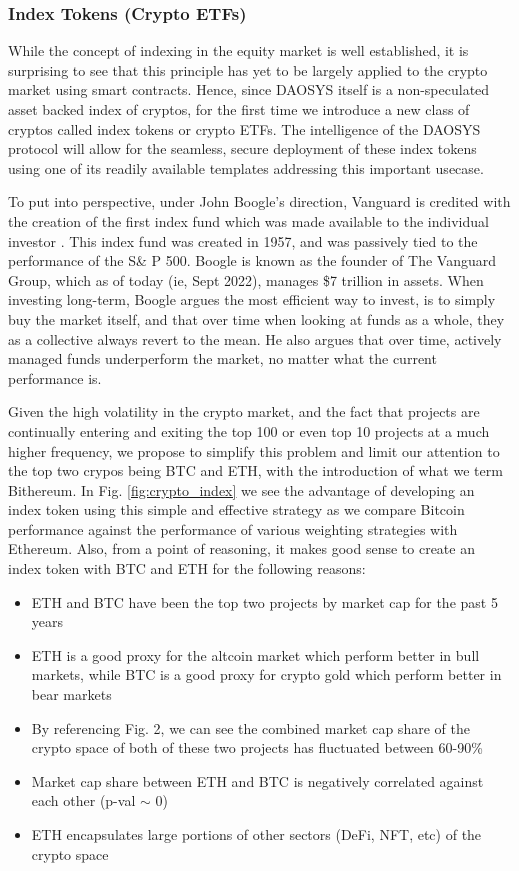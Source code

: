\documentclass[journal,twocolumn,12pt]{ieeesyscoin}
\begin{document}
\subsubsection{Index Tokens (Crypto ETFs)}

While the concept of indexing in the equity market is well established, it is surprising to see that this principle has yet to be largely applied to the crypto market using smart contracts. Hence, since DAOSYS itself is a non-speculated asset backed index of cryptos, for the first time we introduce a new class of cryptos called index tokens or crypto ETFs. The intelligence of the DAOSYS protocol will allow for the seamless, secure deployment of these index tokens using one of its readily available templates addressing this important usecase.

To put into perspective, under John Boogle’s direction, Vanguard is credited with the creation of the first index fund which was made available to the individual investor \cite{Bog17}. This index fund was created in 1957, and was passively tied to the performance of the S\& P 500. Boogle is known as the founder of The Vanguard Group, which as of today (ie, Sept 2022), manages \$7 trillion in assets. When investing long-term, Boogle argues the most efficient way to invest, is to simply buy the market itself, and that over time when looking at funds as a whole, they as a collective always revert to the mean. He also argues that over time, actively managed funds underperform the market, no matter what the current performance is.

Given the high volatility in the crypto market, and the fact that projects are continually entering and exiting the top 100 or even top 10 projects at a much higher frequency, we propose to simplify this problem and limit our attention to the top two crypos being BTC and ETH, with the introduction of what we term Bithereum. In Fig. \ref{fig:crypto_index} we see the advantage of developing an index token using this simple and effective strategy as we compare Bitcoin performance against the performance of various weighting strategies with Ethereum. Also, from a point of reasoning, it makes good sense to create an index token with BTC and ETH for the following reasons:

\begin{itemize}
  \item ETH and BTC have been the top two projects by market cap for the past 5 years
  \item ETH is a good proxy for the altcoin market which perform better in bull markets, while BTC is a good proxy for crypto gold which perform better in bear markets
  \item By referencing Fig. 2, we can see the combined market cap share of the crypto space of both of these two projects has fluctuated between 60-90\%
  \item Market cap share between ETH and BTC is negatively correlated against each other (p-val $\sim$ 0)
  \item ETH encapsulates large portions of other sectors (DeFi, NFT, etc) of the crypto space
\end{itemize}  
\end{document}
